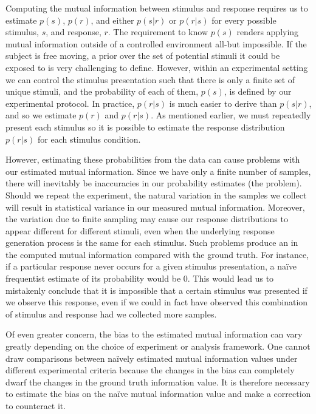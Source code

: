 Computing the mutual information between stimulus and response requires us to estimate $p(s)$, $p(r)$, and either $p(s|r)$ or $p(r|s)$ for every possible stimulus, $s$, and response, $r$.
The requirement to know $p(s)$ renders applying mutual information outside of a controlled environment all-but impossible.
If the subject is free moving, a prior over the set of potential stimuli it could be exposed to is very challenging to define.
However, within an experimental setting we can control the stimulus presentation such that there is only a finite set of unique stimuli, and the probability of each of them, $p(s)$, is defined by our experimental protocol.
In practice, $p(r|s)$ is much easier to derive than $p(s|r)$, and so we estimate $p(r)$ and $p(r|s)$.
As mentioned earlier, we must repeatedly present each stimulus so it is possible to estimate the response distribution $p(r|s)$ for each stimulus condition.

However, estimating these probabilities from the data can cause problems with our estimated mutual information.
Since we have only a finite number of samples, there will inevitably be inaccuracies in our probability estimates (the  problem).
Should we repeat the experiment, the natural variation in the samples we collect will result in statistical variance in our measured mutual information.
Moreover, the variation due to finite sampling may cause our response distributions to appear different for different stimuli, even when the underlying response generation process is the same for each stimulus.
Such problems produce an  in the computed mutual information compared with the ground truth.
For instance, if a particular response never occurs for a given stimulus presentation, a na{\"i}ve frequentist estimate of its probability would be $0$.
This would lead us to mistakenly conclude that it is impossible that a certain stimulus was presented if we observe this response, even if we could in fact have observed this combination of stimulus and response had we collected more samples.

Of even greater concern, the bias to the estimated mutual information can vary greatly depending on the choice of experiment or analysis framework.
One cannot draw comparisons between na{\"i}vely estimated mutual information values under different experimental criteria because the changes in the bias can completely dwarf the changes in the ground truth information value.
It is therefore necessary to estimate the bias on the na{\"i}ve mutual information value and make a correction to counteract it.


